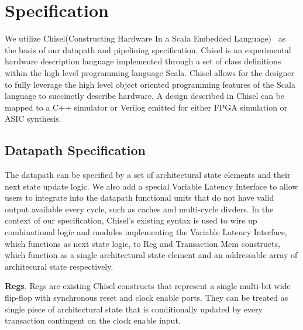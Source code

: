 \section{Specification}
We utilize Chisel(Constructing Hardware In a Scala Embedded
Language)~\cite{Bachrach:2012} as the basis of our datapath and
pipelining specification. Chisel is an experimental hardware
description language implemented through a set of class definitions
within the high level programming language Scala. Chisel allows for
the designer to fully leverage the high level object oriented
programming features of the Scala language to succinctly describe
hardware. A design described in Chisel can be mapped to a C++
simulator or Verilog emitted for either FPGA simulation or ASIC
synthesis.

\subsection{Datapath Specification}
The datapath can be specified by a set of architectural state elements
and their next state update logic. We also add a special Variable
Latency Interface to allow users to integrate into the datapath
functional units that do not have valid output available every cycle,
such as caches and multi-cycle divders. In the context of our
specification, Chisel's existing syntax is used to wire up
combinational logic and modules implementing the Variable Latency
Interface, which functions as next state logic, to Reg and Transaction
Mem constructs, which function as a single architectural state element
and an addressable array of architecural state respectively.

{\bf Regs}. Regs are existing Chisel constructs that represent a
single multi-bit wide flip-flop with synchronous reset and clock
enable ports. They can be treated as single piece of architectural
state that is conditionally updated by every transaction contingent on
the clock enable input.

